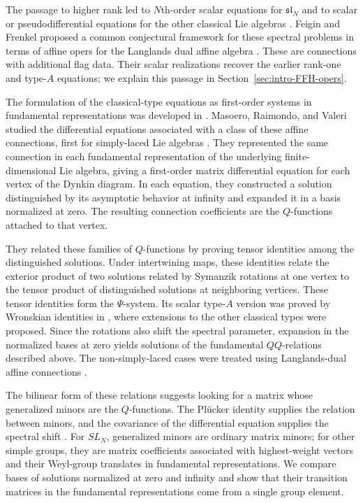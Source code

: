 \documentclass[11pt,leqno]{amsart}
\numberwithin{equation}{section}
\theoremstyle{plain}
\theoremstyle{definition}
\theoremstyle{plain}
\theoremstyle{definition}
\theoremstyle{remark}
\begin{document}
The passage to higher rank led to $N$th-order scalar equations for $\mathfrak{sl}_N$ \cite{Suzuki2000,DDT2000} and to scalar or pseudodifferential equations for the other classical Lie algebras \cite{DDMST2007}.  Feigin and Frenkel proposed a common conjectural framework for these spectral problems in terms of affine opers for the Langlands dual affine algebra \cite{FeiginFrenkel2011}.  These are connections with additional flag data.  Their scalar realizations recover the earlier rank-one and type-$A$ equations; we explain this passage in Section~\ref{sec:intro-FFH-opers}.

The formulation of the classical-type equations as first-order systems in fundamental representations was developed in \cite{Sun2012}.  Masoero, Raimondo, and Valeri studied the differential equations associated with a class of these affine connections, first for simply-laced Lie algebras \cite{MRV2016}.  They represented the same connection in each fundamental representation of the underlying finite-dimensional Lie algebra, giving a first-order matrix differential equation for each vertex of the Dynkin diagram.  In each equation, they constructed a solution distinguished by its asymptotic behavior at infinity and expanded it in a basis normalized at zero.  The resulting connection coefficients are the $Q$-functions attached to that vertex.

They related these families of $Q$-functions by proving tensor identities among the distinguished solutions.  Under intertwining maps, these identities relate the exterior product of two solutions related by Symanzik rotations at one vertex to the tensor product of distinguished solutions at neighboring vertices.  These tensor identities form the $\Psi$-system.  Its scalar type-$A$ version was proved by Wronskian identities in \cite{DDMST2007}, where extensions to the other classical types were proposed.  Since the rotations also shift the spectral parameter, expansion in the normalized bases at zero yields solutions of the fundamental $QQ$-relations described above.  The non-simply-laced cases were treated using Langlands-dual affine connections \cite{MRV2017}.

The bilinear form of these relations suggests looking for a matrix whose generalized minors are the $Q$-functions.  The Pl\"ucker identity supplies the relation between minors, and the covariance of the differential equation supplies the spectral shift \cite{FominZelevinsky1999,KZ2021}.  For $SL_N$, generalized minors are ordinary matrix minors; for other simple groups, they are matrix coefficients associated with highest-weight vectors and their Weyl-group translates in fundamental representations.  We compare bases of solutions normalized at zero and infinity and show that their transition matrices in the fundamental representations come from a single group element.
\end{document}
